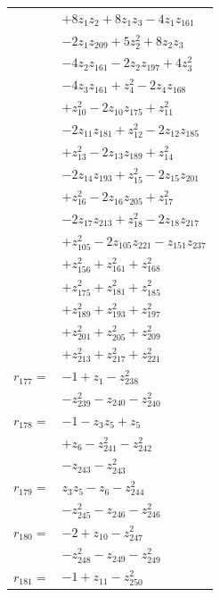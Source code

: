 \begin{longtable}{@{}r@{\;}l@{}}
 & \(\displaystyle +8z_{1}z_{2} +8z_{1}z_{3} -4z_{1}z_{161}\) \\
 & \(\displaystyle -2z_{1}z_{209} +5z_{2}^{2} +8z_{2}z_{3}\) \\
 & \(\displaystyle -4z_{2}z_{161} -2z_{2}z_{197} +4z_{3}^{2}\) \\
 & \(\displaystyle -4z_{3}z_{161} +z_{4}^{2} -2z_{4}z_{168}\) \\
 & \(\displaystyle +z_{10}^{2} -2z_{10}z_{175} +z_{11}^{2}\) \\
 & \(\displaystyle -2z_{11}z_{181} +z_{12}^{2} -2z_{12}z_{185}\) \\
 & \(\displaystyle +z_{13}^{2} -2z_{13}z_{189} +z_{14}^{2}\) \\
 & \(\displaystyle -2z_{14}z_{193} +z_{15}^{2} -2z_{15}z_{201}\) \\
 & \(\displaystyle +z_{16}^{2} -2z_{16}z_{205} +z_{17}^{2}\) \\
 & \(\displaystyle -2z_{17}z_{213} +z_{18}^{2} -2z_{18}z_{217}\) \\
 & \(\displaystyle +z_{105}^{2} -2z_{105}z_{221} -z_{151}z_{237}\) \\
 & \(\displaystyle +z_{156}^{2} +z_{161}^{2} +z_{168}^{2}\) \\
 & \(\displaystyle +z_{175}^{2} +z_{181}^{2} +z_{185}^{2}\) \\
 & \(\displaystyle +z_{189}^{2} +z_{193}^{2} +z_{197}^{2}\) \\
 & \(\displaystyle +z_{201}^{2} +z_{205}^{2} +z_{209}^{2}\) \\
 & \(\displaystyle +z_{213}^{2} +z_{217}^{2} +z_{221}^{2}\) \\[3pt]
\(r_{177}=\) & \(\displaystyle -1 +z_{1} -z_{238}^{2}\) \\
 & \(\displaystyle -z_{239}^{2} -z_{240} -z_{240}^{2}\) \\[3pt]
\(r_{178}=\) & \(\displaystyle -1 -z_{3}z_{5} +z_{5}\) \\
 & \(\displaystyle +z_{6} -z_{241}^{2} -z_{242}^{2}\) \\
 & \(\displaystyle -z_{243} -z_{243}^{2}\) \\[3pt]
\(r_{179}=\) & \(\displaystyle z_{3}z_{5} -z_{6} -z_{244}^{2}\) \\
 & \(\displaystyle -z_{245}^{2} -z_{246} -z_{246}^{2}\) \\[3pt]
\(r_{180}=\) & \(\displaystyle -2 +z_{10} -z_{247}^{2}\) \\
 & \(\displaystyle -z_{248}^{2} -z_{249} -z_{249}^{2}\) \\[3pt]
\(r_{181}=\) & \(\displaystyle -1 +z_{11} -z_{250}^{2}\) \\

\end{longtable}
